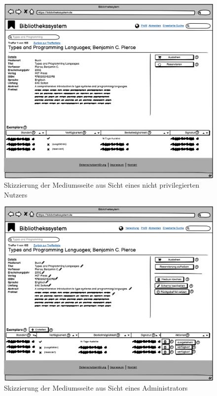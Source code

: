 \documentclass{article}
\begin{document}
\begin{figure}[h]
    \includegraphics[width = 40em]{Mediumsseite}
    \caption{Skizzierung der Mediumsseite aus Sicht eines nicht privilegierten Nutzers}
    \label{mediumsseite_angemeldet}
\end{figure}

\begin{figure}[h]
    \includegraphics[width = 40em]{Mediumsseite_Admin}
    \caption{Skizzierung der Mediumsseite aus Sicht eines Administrators}
    \label{mediumsseite_admin}
\end{figure}
\end{document}

